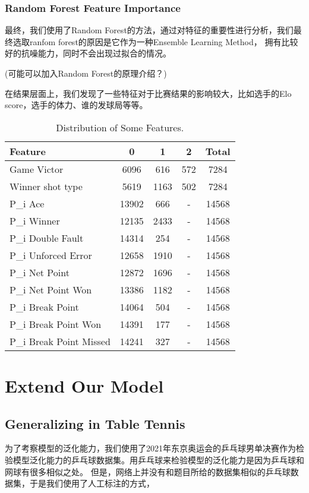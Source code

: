 \documentclass{ctexart}
\begin{document}
\subsubsection{Random Forest Feature Importance}
最终，我们使用了Random Forest的方法，通过对特征的重要性进行分析，我们最终选取ranfom forest的原因是它作为一种Ensemble Learning Method，
拥有比较好的抗噪能力，同时不会出现过拟合的情况。
\par (可能可以加入Random Forest的原理介绍？)\par
在结果层面上，我们发现了一些特征对于比赛结果的影响较大，比如选手的Elo score，选手的体力、谁的发球局等等。
\begin{table}[htbp]
\centering
\caption{Distribution of Some Features.}
\label{tab:feature_distribution}
\begin{tabular}{lcccc}
\toprule
Feature & 0 & 1 & 2 & Total \\
\midrule
Game Victor & 6096 & 616 & 572 & 7284 \\
Winner shot type & 5619 & 1163 & 502 & 7284 \\
P_i Ace & 13902 & 666 & - & 14568 \\
P_i Winner & 12135 & 2433 & - & 14568 \\
P_i Double Fault & 14314 & 254 & - & 14568 \\
P_i Unforced Error & 12658 & 1910 & - & 14568 \\
P_i Net Point & 12872 & 1696 & - & 14568 \\
P_i Net Point Won & 13386 & 1182 & - & 14568 \\
P_i Break Point & 14064 & 504 & - & 14568 \\
P_i Break Point Won & 14391 & 177 & - & 14568 \\
P_i Break Point Missed & 14241 & 327 & - & 14568 \\
\bottomrule
\end{tabular}
\end{table}
    

\section{Extend Our Model}
\subsection{Generalizing in Table Tennis}
为了考察模型的泛化能力，我们使用了2021年东京奥运会的乒乓球男单决赛作为检验模型泛化能力的乒乓球数据集。用乒乓球来检验模型的泛化能力是因为乒乓球和网球有很多相似之处。
但是，网络上并没有和题目所给的数据集相似的乒乓球数据集，于是我们使用了人工标注的方式，
\end{document}
